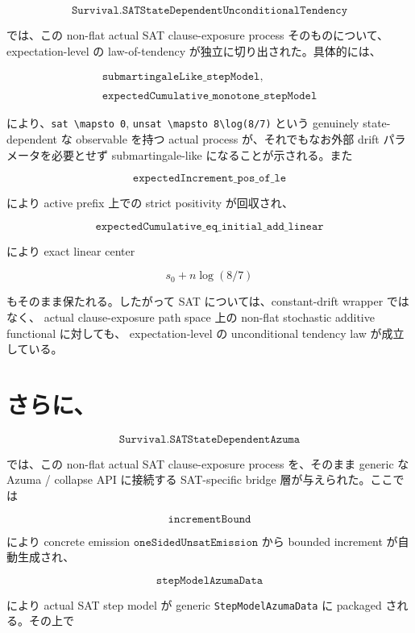 \documentclass[12pt,a4paper]{article}
\begin{document}
\[
\texttt{Survival.SATStateDependentUnconditionalTendency}
\]

では、この non-flat actual SAT clause-exposure process そのものについて、expectation-level の law-of-tendency が独立に切り出された。具体的には、

\[
\begin{aligned}
\texttt{submartingaleLike\_stepModel}, \\
\qquad \\
\texttt{expectedCumulative\_monotone\_stepModel}
\end{aligned}
\]

により、\texttt{sat\ \textbackslash{}mapsto\ 0}, \texttt{unsat\ \textbackslash{}mapsto\ 8\textbackslash{}log(8/7)} という genuinely state-dependent な observable を持つ actual process が、それでもなお外部 drift パラメータを必要とせず submartingale-like になることが示される。また

\[
\texttt{expectedIncrement\_pos\_of\_le}
\]

により active prefix 上での strict positivity が回収され、

\[
\texttt{expectedCumulative\_eq\_initial\_add\_linear}
\]

により exact linear center

\[
s_0 + n\log(8/7)
\]

もそのまま保たれる。したがって SAT については、constant-drift wrapper ではなく、 actual clause-exposure path space 上の non-flat stochastic additive functional に対しても、 expectation-level の unconditional tendency law が成立している。

\section{さらに、}\label{ux3055ux3089ux306b-18}

\[
\texttt{Survival.SATStateDependentAzuma}
\]

では、この non-flat actual SAT clause-exposure process を、そのまま generic な Azuma / collapse API に接続する SAT-specific bridge 層が与えられた。ここでは

\[
\texttt{incrementBound}
\]

により concrete emission \(\texttt{oneSidedUnsatEmission}\) から bounded increment が自動生成され、

\[
\texttt{stepModelAzumaData}
\]

により actual SAT step model が generic \texttt{StepModelAzumaData} に packaged される。その上で
\end{document}
